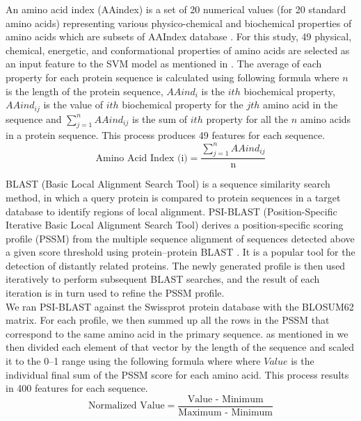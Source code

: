     An amino acid index (AAindex) is a set of 20 numerical values (for 20 standard amino acids) representing various physico-chemical 
    and biochemical properties of amino acids which are subsets of AAIndex database \cite{aaindex}. For this study, 49 physical, 
    chemical, energetic, and conformational properties of amino acids are selected as an input feature to the 
    SVM model as mentioned in \cite{mishra2014prediction}. The average of each property for each protein sequence 
    is calculated using following formula where $n$ is the length of the protein sequence, $AAind_{i}$ is the $ith$ biochemical property, $AAind_{ij}$ is the value of $ith$ 
    biochemical property for the $jth$ amino acid in the sequence and $\sum_{j=1}^{n} AAind_{ij}$ is the sum of $ith$ property for all the
    $n$ amino acids in a protein sequence. This process produces 49 features for each sequence.
    \begin{equation}
        \text{Amino Acid Index (i)} = \frac {\sum_{j=1}^{n} AAind_{ij}} {\text{n}}
    \end{equation}

    BLAST (Basic Local Alignment Search Tool) is a sequence similarity search method, in which a query protein 
    is compared to protein sequences in a target database to identify regions of local alignment. PSI-BLAST 
    (Position-Specific Iterative Basic Local Alignment Search Tool) derives a position-specific scoring profile (PSSM) 
    from the multiple sequence alignment of sequences detected above a given score threshold using 
    protein–protein BLAST \cite{bergman2007comparative}. It is a popular tool for the detection of distantly related proteins.
    The newly generated profile is then used iteratively to perform subsequent BLAST searches, 
    and the result of each iteration is in turn used to refine the PSSM profile.\\ 
    
    We ran PSI-BLAST against the Swissprot protein database with the BLOSUM62 matrix. For each profile, we then 
    summed up all the rows in the PSSM that correspond to the same amino acid in the primary sequence. as mentioned in \cite{mishra2014prediction} 
    we then divided each element  of that vector by the length of the sequence and scaled it to the 0–1 range using the following formula 
    where where $Value$ is the individual final sum of the PSSM score for each amino acid. 
    This process results in 400 features for each sequence.
    \begin{equation}
        \text{Normalized Value} = \frac {\text{Value - Minimum}} {\text{Maximum - Minimum}}
    \end{equation}


